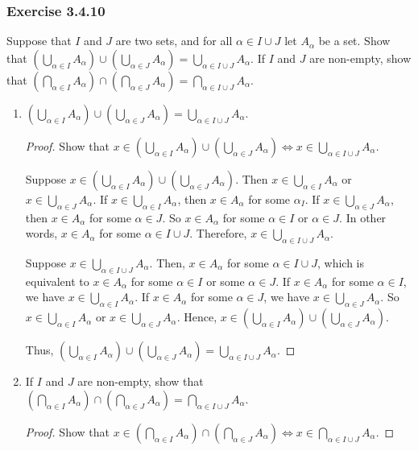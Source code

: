 \documentclass[12pt, letter]{article}
\begin{document}
\subsubsection*{Exercise 3.4.10}
Suppose that $I$ and $J$ are two sets, and for all $\alpha\in I\cup J$ let $A_{\alpha}$ be a set. Show that $(\bigcup_{\alpha\in I}A_{\alpha})\cup(\bigcup_{\alpha\in J}A_{\alpha})=\bigcup_{\alpha\in I\cup J}A_\alpha$. 
If $I$ and $J$ are non-empty, show that $(\bigcap_{\alpha\in I}A_{\alpha})\cap(\bigcap_{\alpha\in J}A_{\alpha})=\bigcap_{\alpha\in I\cup J}A_{\alpha}$.
\begin{enumerate}
    \item $(\bigcup_{\alpha\in I}A_{\alpha})\cup(\bigcup_{\alpha\in J}A_{\alpha})=\bigcup_{\alpha\in I\cup J}A_\alpha$.
    \begin{proof}
        Show that $x\in(\bigcup_{\alpha\in I}A_{\alpha})\cup(\bigcup_{\alpha\in J}A_{\alpha})\iff x\in\bigcup_{\alpha\in I\cup J}A_\alpha$.

        Suppose $x\in(\bigcup_{\alpha\in I}A_{\alpha})\cup(\bigcup_{\alpha\in J}A_{\alpha})$. Then $x\in \bigcup_{\alpha\in I}A_{\alpha}$ or $x\in\bigcup_{\alpha\in J}A_{\alpha}$. If $x\in \bigcup_{\alpha\in I}A_{\alpha}$, then 
        $x\in A_\alpha$ for some $\alpha_I$. If $x\in\bigcup_{\alpha\in J}A_{\alpha}$, then $x\in A_{\alpha}$ for some $\alpha\in J$. So $x\in A_{\alpha}$ for some $\alpha\in I$ or $\alpha\in J$. In other words, 
        $x\in A_\alpha$ for some $\alpha\in I\cup J$. Therefore, $x\in\bigcup_{\alpha\in I\cup J}A_\alpha$.

        Suppose $x\in\bigcup_{\alpha\in I\cup J}A_\alpha$. Then, $x\in A_\alpha$ for some $\alpha\in I\cup J$, which is equivalent to $x\in A_\alpha$ for some $\alpha\in I$ or some $\alpha\in J$.
        If $x\in A_\alpha$ for some $\alpha\in I$, we have $x\in \bigcup_{\alpha\in I}A_\alpha$. If $x\in A_\alpha$ for some $\alpha\in J$, we have $x\in\bigcup_{\alpha\in J}A_\alpha$. So $x\in \bigcup_{\alpha\in I}A_\alpha$
        or $x\in\bigcup_{\alpha\in J}A_\alpha$. Hence, $x\in(\bigcup_{\alpha\in I}A_{\alpha})\cup(\bigcup_{\alpha\in J}A_{\alpha})$.

        Thus, $(\bigcup_{\alpha\in I}A_{\alpha})\cup(\bigcup_{\alpha\in J}A_{\alpha})=\bigcup_{\alpha\in I\cup J}A_\alpha$.
    \end{proof}
    \item If $I$ and $J$ are non-empty, show that $(\bigcap_{\alpha\in I}A_{\alpha})\cap(\bigcap_{\alpha\in J}A_{\alpha})=\bigcap_{\alpha\in I\cup J}A_{\alpha}$.
    \begin{proof}
        Show that $x\in (\bigcap_{\alpha\in I}A_{\alpha})\cap(\bigcap_{\alpha\in J}A_{\alpha})\iff x\in\bigcap_{\alpha\in I\cup J}A_{\alpha}$.


\end{proof}
\end{enumerate}
\end{document}
